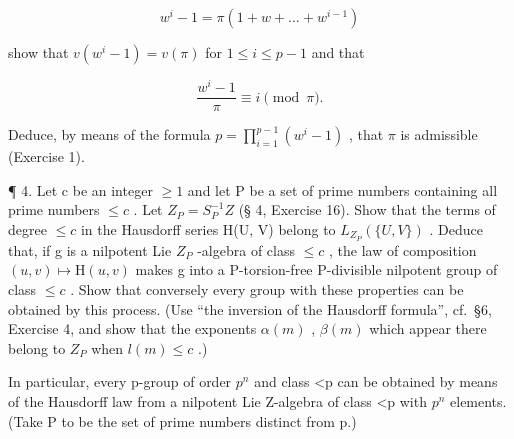 \[
w ^ {i} - 1 = \pi (1 + w + \dots + w ^ {i - 1})
\]

show that \(v(w^{i} - 1) = v(\pi)\) for \(1 \leqslant i \leqslant p - 1\) and that

\[
\frac {w ^ {i} - 1}{\pi} \equiv i \pmod {\pi}.
\]

Deduce, by means of the formula \(p = \prod_{i=1}^{p-1} (w^i - 1)\) , that \(\pi\) is admissible (Exercise 1).

¶ 4. Let c be an integer \(\geqslant1\) and let P be a set of prime numbers containing all prime numbers \(\leqslant c\) . Let \(Z_{P}=S_{P}^{-1}Z\) (§ 4, Exercise 16). Show that the terms of degree \(\leqslant c\) in the Hausdorff series H(U, V) belong to \(L_{Z_{P}}(\{U, V\})\) . Deduce that, if g is a nilpotent Lie \(Z_{P}\) -algebra of class \(\leqslant c\) , the law of composition \((u,v)\mapsto\mathrm{H}(u,v)\) makes g into a P-torsion-free P-divisible nilpotent group of class \(\leqslant c\) . Show that conversely every group with these properties can be obtained by this process. (Use ``the inversion of the Hausdorff formula'', cf.~§6, Exercise 4, and show that the exponents \(\alpha(m)\) , \(\beta(m)\) which appear there belong to \(Z_{P}\) when \(l(m)\leqslant c\) .)

In particular, every p-group of order \(p^{n}\) and class \textless p can be obtained by means of the Hausdorff law from a nilpotent Lie Z-algebra of class \textless p with \(p^{n}\) elements. (Take P to be the set of prime numbers distinct from p.)

